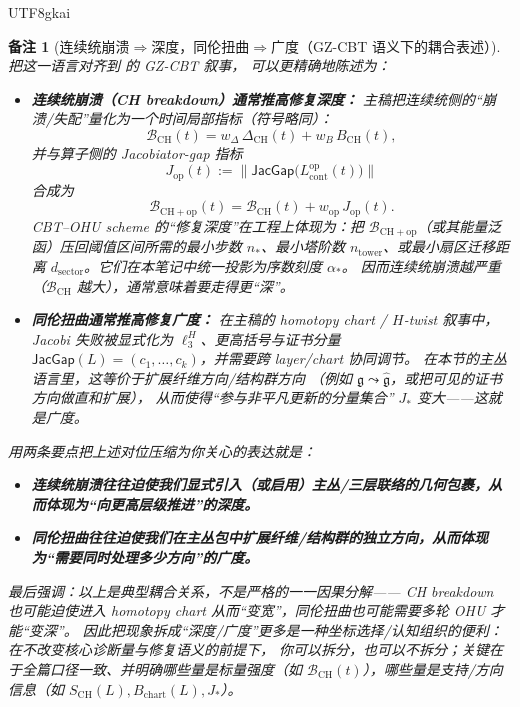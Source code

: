 \documentclass[12pt]{article}
\newtheorem{remark}{备注}[section]
\newcommand{\JacGap}{\mathsf{JacGap}}
\begin{document}
\begin{CJK*}{UTF8}{gkai}
\begin{remark}[连续统崩溃$\Rightarrow$深度，同伦扭曲$\Rightarrow$广度（GZ-CBT 语义下的耦合表述）]
把这一语言对齐到 \cite{GaoZheng2025GFramework} 的 GZ-CBT 叙事，
可以更精确地陈述为：
\begin{itemize}
  \item \textbf{连续统崩溃（CH breakdown）通常推高修复深度：}
        主稿把连续统侧的“崩溃/失配”量化为一个时间局部指标（符号略同）：
        \[
          \mathcal{B}_{\mathrm{CH}}(t)
          =
          w_{\Delta}\,\Delta_{\mathrm{CH}}(t)
          +
          w_{B}\,B_{\mathrm{CH}}(t),
        \]
        并与算子侧的 Jacobiator-gap 指标
        \[
          J_{\mathrm{op}}(t)
          :=
          \bigl\|
            \JacGap\bigl(L^{\mathrm{op}}_{\mathrm{cont}}(t)\bigr)
          \bigr\|
        \]
        合成为
        \[
          \mathcal{B}_{\mathrm{CH+op}}(t)
          =
          \mathcal{B}_{\mathrm{CH}}(t)
          +
          w_{\mathrm{op}}\,J_{\mathrm{op}}(t).
        \]
        CBT--OHU scheme 的“修复深度”在工程上体现为：把
        $\mathcal{B}_{\mathrm{CH+op}}$（或其能量泛函）压回阈值区间所需的最小步数
        $n_\ast$、最小塔阶数 $n_{\mathrm{tower}}$、或最小扇区迁移距离
        $d_{\mathrm{sector}}$。它们在本笔记中统一投影为序数刻度 $\alpha_\ast$。
        因而连续统崩溃越严重（$\mathcal{B}_{\mathrm{CH}}$ 越大），通常意味着要走得更“深”。
  \item \textbf{同伦扭曲通常推高修复广度：}
        在主稿的 homotopy chart / $H$-twist 叙事中，Jacobi 失败被显式化为
        $\ell_3^H$、更高括号与证书分量
        $\JacGap(L)=(c_1,\dots,c_k)$，并需要跨 layer/chart 协同调节。
        在本节的主丛语言里，这等价于\emph{扩展纤维方向/结构群方向}
        （例如 $\mathfrak g\leadsto\widehat{\mathfrak g}$，或把可见的证书方向做直和扩展），
        从而使得“参与非平凡更新的分量集合” $J_\ast$ 变大——这就是广度。
\end{itemize}

用两条要点把上述对位压缩为你关心的表达就是：
\begin{itemize}
  \item \textbf{连续统崩溃往往迫使我们显式引入（或启用）主丛/三层联络的几何包裹，从而体现为“向更高层级推进”的深度。}
  \item \textbf{同伦扭曲往往迫使我们在主丛包中扩展纤维/结构群的独立方向，从而体现为“需要同时处理多少方向”的广度。}
\end{itemize}

最后强调：以上是\emph{典型耦合关系}，不是严格的一一因果分解——
CH breakdown 也可能迫使进入 homotopy chart 从而“变宽”，同伦扭曲也可能需要多轮 OHU 才能“变深”。
因此把现象拆成“深度/广度”更多是一种\emph{坐标选择/认知组织的便利}：在不改变核心诊断量与修复语义的前提下，
你可以拆分，也可以不拆分；关键在于全篇口径一致、并明确哪些量是标量强度（如 $\mathcal{B}_{\mathrm{CH}}(t)$），哪些量是支持/方向信息（如 $S_{\mathrm{CH}}(L),B_{\mathrm{chart}}(L),J_\ast$）。
\end{remark}


\end{CJK*}
\end{document}
